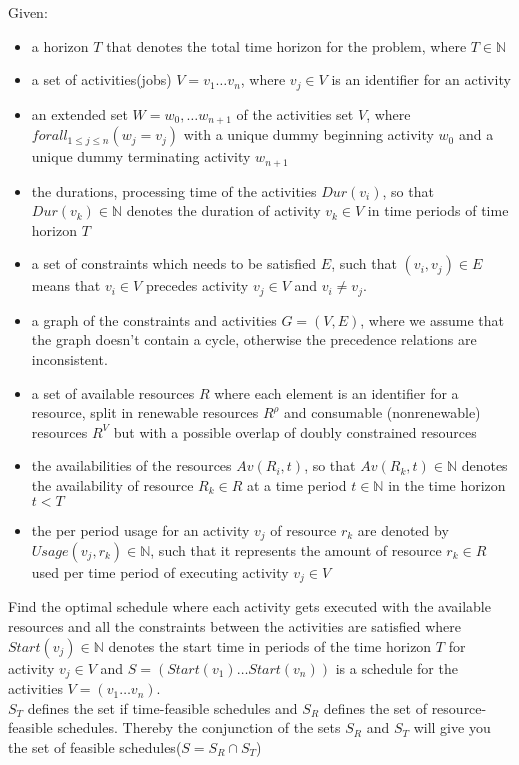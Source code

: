 \documentclass{article}
\begin{document}
Given:
\begin{itemize}
\item a horizon $T$ that denotes the total time horizon for the problem, where $T \in \mathbb{N}$
\item a set of activities(jobs) $V = v_1 \ldots v_n$, where $v_j \in V$ is an identifier for an activity
\item an extended set $W = w_0, \ldots w_{n+1}$ of the activities set $V$, where $forall_{1 \leq j \leq n}(w_j = v_j)$ with a unique dummy beginning activity $w_0$ and a unique dummy terminating activity $w_{n+1}$
\item the durations, processing time of the activities $Dur(v_i)$, so that $Dur(v_k) \in \mathbb{N}$ denotes the duration of activity $v_k \in V$ in time periods of time horizon $T$
\item a set of constraints which needs to be satisfied $E$, such that $(v_i,v_j) \in E$ means that $v_i \in V$ precedes activity $v_j \in V$ and $v_i \neq v_j$.
\item a graph of the constraints and activities $G = (V, E)$, where we assume that the graph doesn't contain a cycle, otherwise the precedence relations are inconsistent.
\item a set of available resources $R$ where each element is an identifier for a resource, split in renewable resources $R^{\rho}$ and  consumable (nonrenewable) resources $R^V$ but with a possible overlap of doubly constrained resources
\item the availabilities of the resources $Av(R_i, t)$, so that $Av(R_k, t) \in \mathbb{N}$ denotes the availability of resource $R_k \in R$ at a time period $t \in \mathbb{N}$ in the time horizon $t < T$
\item the per period usage for an activity $v_j$ of resource $r_k$ are denoted by $Usage(v_j, r_k) \in \mathbb{N}$, such that it represents the amount of resource $r_k \in R$ used per time period of executing activity $v_j \in V$
\end{itemize}

Find the optimal schedule where each activity gets executed with the available resources and all the constraints between the activities are satisfied where $Start(v_j) \in \mathbb{N}$ denotes the start time in periods of the time horizon $T$ for activity $v_j \in V$ and
$S = (Start(v_1) \ldots Start(v_n))$ is a schedule for the activities $V = (v_1 \ldots v_n)$.
\\
$S_T$ defines the set if time-feasible schedules and $S_R$ defines the set of resource-feasible schedules.
Thereby the conjunction of the sets $S_R$ and $S_T$ will give you the set of feasible schedules($S = S_R \cap S_T$)
\end{document}
